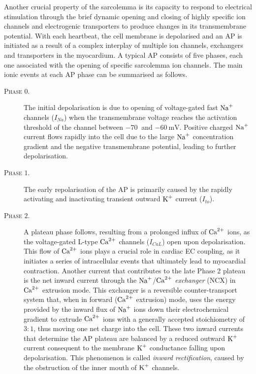 
\vspace{0.2cm}
Another crucial property of the sarcolemma is its capacity to respond to electrical stimulation through the brief dynamic opening and closing of highly specific ion channels and electrogenic transporters to produce changes in its transmembrane potential. With each heartbeat, the cell membrane is depolarised and an AP is initiated as a result of a complex interplay of multiple ion channels, exchangers and transporters in the myocardium. A typical AP consists of five phases, each one associated with the opening of specific sarcolemma ion channels. The main ionic events at each AP phase can be summarised as follows.

\begin{description}
	\item[\textsc{Phase $0$.}] The initial depolarisation is due to opening of voltage-gated fast $\textrm{Na}^{+}$ channels ($I_{Na}$) when the transmembrane voltage reaches the activation threshold of the channel between $\SI{-70}{}$ and $\SI{-60}{\milli\volt}$. Positive charged $\textrm{Na}^{+}$ current flows rapidly into the cell due to the large $\textrm{Na}^{+}$ concentration gradient and the negative transmembrane potential, leading to further depolarisation.
	\item[\textsc{Phase $1$.}] The early repolarisation of the AP is primarily caused by the rapidly activating and inactivating transient outward $\textrm{K}^{+}$ current ($I_{to}$).
	\item[\textsc{Phase $2$.}] A plateau phase follows, resulting from a prolonged influx of $\textrm{Ca}^{2+}$ ions, as the voltage-gated L-type $\textrm{Ca}^{2+}$ channels ($I_{CaL}$) open upon depolarisation. This flow of $\textrm{Ca}^{2+}$ ions plays a crucial role in cardiac EC coupling, as it initiates a series of intracellular events that ultimately lead to myocardial contraction. Another current that contributes to the late Phase 2 plateau is the net inward current through the $\textrm{Na}^{+}$/$\textrm{Ca}^{2+}$ \textit{exchanger} (\acs{NCX}) in $\textrm{Ca}^{2+}$ extrusion mode. This exchanger is a reversible counter-transport system that, when in forward ($\textrm{Ca}^{2+}$ extrusion) mode, uses the energy provided by the inward flux of $\textrm{Na}^{+}$ ions down their electrochemical gradient to extrude $\textrm{Ca}^{2+}$ ions with a generally accepted stoichiometry of $3\colon 1$, thus moving one net charge into the cell. These two inward currents that determine the AP plateau are balanced by a reduced outward $\textrm{K}^{+}$ current consequent to the membrane $\textrm{K}^{+}$ conductance falling upon depolarisation. This phenomenon is called \textit{inward rectification}, caused by the obstruction of the inner mouth of $\textrm{K}^{+}$ channels.

\end{description}
